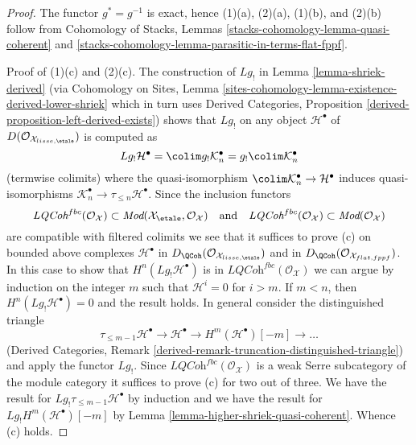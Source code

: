 \begin{proof}
The functor $g^* = g^{-1}$ is exact, hence (1)(a), (2)(a), (1)(b), and (2)(b)
follow from Cohomology of Stacks,
Lemmas \ref{stacks-cohomology-lemma-quasi-coherent} and
\ref{stacks-cohomology-lemma-parasitic-in-terms-flat-fppf}.

\medskip\noindent
Proof of (1)(c) and (2)(c).
The construction of $Lg_!$ in Lemma \ref{lemma-shriek-derived}
(via Cohomology on Sites,
Lemma \ref{sites-cohomology-lemma-existence-derived-lower-shriek}
which in turn uses
Derived Categories, Proposition \ref{derived-proposition-left-derived-exists})
shows that $Lg_!$ on any object $\mathcal{H}^\bullet$ of
$D(\mathcal{O}_{\mathcal{X}_{lisse,\etale}})$ is computed
as
$$
Lg_!\mathcal{H}^\bullet = \colim g_!\mathcal{K}_n^\bullet =
g_! \colim \mathcal{K}_n^\bullet
$$
(termwise colimits) where the quasi-isomorphism
$\colim \mathcal{K}_n^\bullet \to \mathcal{H}^\bullet$
induces quasi-isomorphisms
$\mathcal{K}_n^\bullet \to \tau_{\leq n} \mathcal{H}^\bullet$.
Since the inclusion functors
$$
\textit{LQCoh}^{fbc}(\mathcal{O}_\mathcal{X}) \subset
\textit{Mod}(\mathcal{X}_\etale, \mathcal{O}_\mathcal{X})
\quad\text{and}\quad
\textit{LQCoh}^{fbc}(\mathcal{O}_\mathcal{X}) \subset
\textit{Mod}(\mathcal{O}_\mathcal{X})
$$
are compatible with filtered colimits we see that it suffices to prove (c)
on bounded above complexes $\mathcal{H}^\bullet$ in
$D_\QCoh(\mathcal{O}_{\mathcal{X}_{lisse,\etale}})$ and in
$D_\QCoh(\mathcal{O}_{\mathcal{X}_{flat,fppf}})$.
In this case to show that $H^n(Lg_!\mathcal{H}^\bullet)$ is
in $\textit{LQCoh}^{fbc}(\mathcal{O}_\mathcal{X})$
we can argue by induction on the integer
$m$ such that $\mathcal{H}^i = 0$ for $i > m$. If $m < n$, then
$H^n(Lg_!\mathcal{H}^\bullet) = 0$ and the result holds. In general
consider the distinguished triangle
$$
\tau_{\leq m - 1}\mathcal{H}^\bullet \to \mathcal{H}^\bullet \to
H^m(\mathcal{H}^\bullet)[-m] \to \ldots
$$
(Derived Categories, Remark
\ref{derived-remark-truncation-distinguished-triangle})
and apply the functor $Lg_!$. Since
$\textit{LQCoh}^{fbc}(\mathcal{O}_\mathcal{X})$
is a weak Serre subcategory of the module category it suffices to
prove (c) for two out of three. We have the result for
$Lg_!\tau_{\leq m - 1}\mathcal{H}^\bullet$ by induction and we
have the result for $Lg_!H^m(\mathcal{H}^\bullet)[-m]$ by
Lemma \ref{lemma-higher-shriek-quasi-coherent}. Whence (c) holds.


\end{proof}
